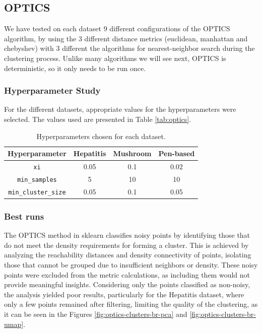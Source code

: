 \subsection{OPTICS}
We have tested on each dataset 9 different configurations of the OPTICS algorithm, by using the 3 different
distance metrics (euclidean, manhattan and chebyshev) with 3 different the algorithms for nearest-neighbor search
 during the clustering process. Unlike many algorithms we will see next, OPTICS is deterministic, so it only needs to be run once.
\subsubsection{Hyperparameter Study}
For the different datasets, appropriate values for the hyperparameters were selected. The values used are presented in Table \ref{tab:optics}.
\begin{table}[h!]
    \centering
    \begin{tabular}{|c|c|c|c|}
    \hline
    \textbf{Hyperparameter}     & \textbf{Hepatitis} & \textbf{Mushroom} & \textbf{Pen-based} \\ \hline
    \texttt{xi}                 &  0.05         &   0.1       &  0.02         \\ \hline
    \texttt{min\_samples}       &     5      &     10     &     10   \\ \hline
    \texttt{min\_cluster\_size} &     0.05      &     0.1     &    0.05       \\ \hline
    \end{tabular}
	\caption{Hyperparameters chosen for each dataset.}\label{tab:hyper-choices}
    \end{table}
\subsubsection{Best runs}


The OPTICS method in sklearn classifies noisy points by identifying those that do not meet the density requirements for
 forming a cluster. This is achieved by analyzing the reachability distances and density connectivity of points, isolating
  those that cannot be grouped due to insufficient neighbors or density. These noisy points were excluded from the metric
   calculations, as including them would not provide meaningful insights. Considering only the points classified as non-noisy, 
   the analysis yielded poor results, particularly for the Hepatitis dataset, where only a few points remained after filtering, 
   limiting the quality of the clustering, as it can be seen in the Figures \ref{fig:optics-clusters-br-pca} and \ref{fig:optics-clusters-br-umap}.

